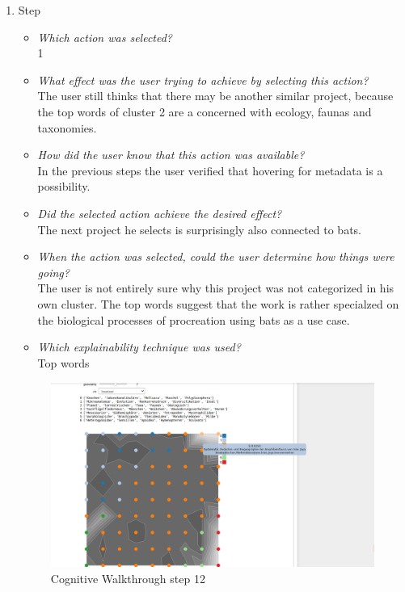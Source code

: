 {\begin{enumerate}
		\item Step
		\begin{itemize}
			\item \textit{Which action was selected?} \\
			1
			\item \textit{What effect was the user trying to achieve by selecting this action?} \\
			The user still thinks that there may be another similar project, because the top words of cluster 2 are a concerned with ecology, faunas and taxonomies. 
			\item \textit{How did the user know that this action was available?} \\
			In the previous steps the user verified that hovering for metadata is a possibility. 
			\item \textit{Did the selected action achieve the desired effect?} \\
			The next project he selects is surprisingly also connected to bats.  
			\item \textit{When the action was selected, could the user determine how things were going?} \\
			The user is not entirely sure why this project was not categorized in his own cluster. The top words suggest that the work is rather specialzed on the biological processes of procreation using bats as a use case. 
			\item \textit{Which explainability technique was used?}\\
			Top words
		\end{itemize}
		\begin{figure}[H]
			\centering
			\includegraphics[width=400px]{../chapters/validation/pics/10_c}
			\caption{\label{pic:step12} Cognitive Walkthrough step 12}
		\end{figure}
\end{enumerate}}

